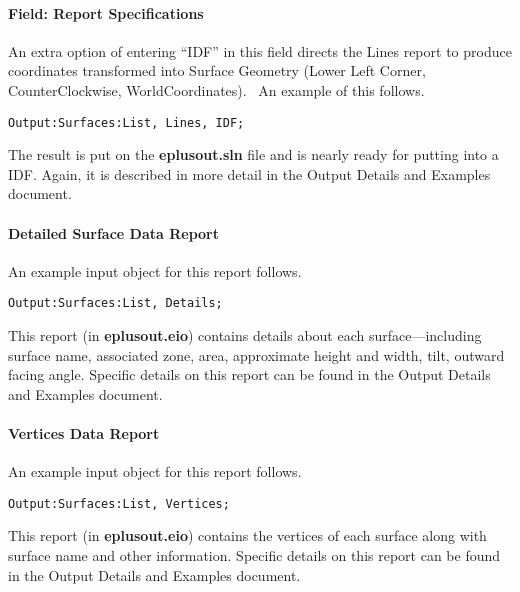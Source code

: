 \paragraph{Field: Report Specifications}\label{field-report-specifications}

An extra option of entering ``IDF'' in this field directs the Lines report to produce coordinates transformed into Surface Geometry (Lower Left Corner, CounterClockwise, WorldCoordinates).~ An example of this follows.

\begin{lstlisting}
Output:Surfaces:List, Lines, IDF;
\end{lstlisting}

The result is put on the \textbf{eplusout.sln} file and is nearly ready for putting into a IDF. Again, it is described in more detail in the Output Details and Examples document.

\paragraph{Detailed Surface Data Report}\label{detailed-surface-data-report}

An example input object for this report follows.

\begin{lstlisting}
Output:Surfaces:List, Details;
\end{lstlisting}

This report (in \textbf{eplusout.eio}) contains details about each surface---including surface name, associated zone, area, approximate height and width, tilt, outward facing angle. Specific details on this report can be found in the Output Details and Examples document.

\paragraph{Vertices Data Report}\label{vertices-data-report}

An example input object for this report follows.

\begin{lstlisting}
Output:Surfaces:List, Vertices;
\end{lstlisting}

This report (in \textbf{eplusout.eio}) contains the vertices of each surface along with surface name and other information. Specific details on this report can be found in the Output Details and Examples document.

